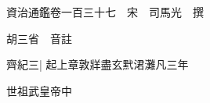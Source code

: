 






























































資治通鑑卷一百三十七　宋　司馬光　撰

胡三省　音註

齊紀三|{
	起上章敦牂盡玄黓涒灘凡三年}


世祖武皇帝中

